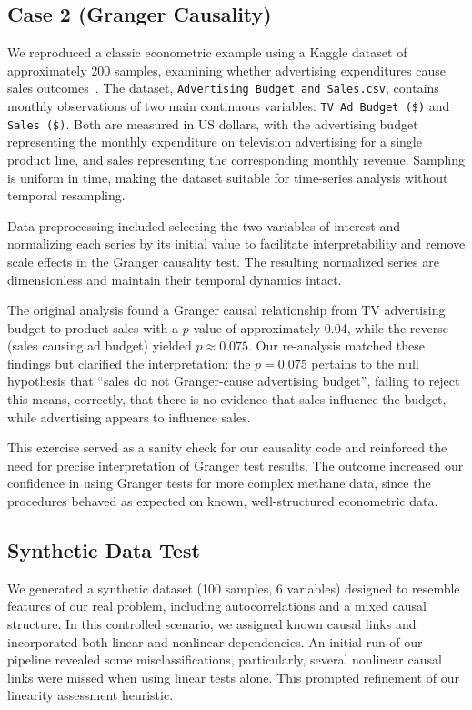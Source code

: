 \subsection{Case 2 (Granger Causality)}
We reproduced a classic econometric example using a Kaggle dataset of approximately 200 samples, examining whether advertising expenditures cause sales outcomes~\cite{Regi2023}. The dataset, \texttt{Advertising Budget and Sales.csv}, contains monthly observations of two main continuous variables: \texttt{TV Ad Budget (\$)} and \texttt{Sales (\$)}. Both are measured in US dollars, with the advertising budget representing the monthly expenditure on television advertising for a single product line, and sales representing the corresponding monthly revenue. Sampling is uniform in time, making the dataset suitable for time-series analysis without temporal resampling.  

Data preprocessing included selecting the two variables of interest and normalizing each series by its initial value to facilitate interpretability and remove scale effects in the Granger causality test. The resulting normalized series are dimensionless and maintain their temporal dynamics intact.  

The original analysis found a Granger causal relationship from TV advertising budget to product sales with a $p$-value of approximately 0.04, while the reverse (sales causing ad budget) yielded $p \approx 0.075$. Our re-analysis matched these findings but clarified the interpretation: the $p = 0.075$ pertains to the null hypothesis that ``sales do not Granger-cause advertising budget'', failing to reject this means, correctly, that there is no evidence that sales influence the budget, while advertising appears to influence sales.  

This exercise served as a sanity check for our causality code and reinforced the need for precise interpretation of Granger test results. The outcome increased our confidence in using Granger tests for more complex methane data, since the procedures behaved as expected on known, well-structured econometric data.


\subsection{Synthetic Data Test}
We generated a synthetic dataset (100 samples, 6 variables) designed to resemble features of our real problem, including autocorrelations and a mixed causal structure. In this controlled scenario, we assigned known causal links and incorporated both linear and nonlinear dependencies. An initial run of our pipeline revealed some misclassifications, particularly, several nonlinear causal links were missed when using linear tests alone. This prompted refinement of our linearity assessment heuristic.

